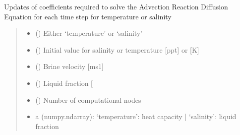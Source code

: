 \documentclass[a4paper,11pt,english,openany]{sphinxmanual}
\begin{document}
\begin{fulllineitems}
\label{\detokenize{api/spyice.coefficients:src.spyice.coefficients.update_coefficients}}
\pysigstartsignatures
\pysiglinewithargsret
{}
{\sphinxparamcomma {}\sphinxparamcomma {}\sphinxparamcomma {}\sphinxparamcomma {}\sphinxparamcomma {}}
{}
\pysigstopsignatures
\sphinxAtStartPar
Updates of coefficients required to solve the Advection Reaction Diffusion Equation for each time step for temperature or salinity
\begin{quote}\begin{description}
\begin{itemize}
\item {} 
\sphinxAtStartPar
{} () \textendash{} Either ‘temperature’ or ‘salinity’

\item {} 
\sphinxAtStartPar
{} () \textendash{} Initial value for salinity or temperature {[}ppt{]} or {[}K{]}

\item {} 
\sphinxAtStartPar
{} () \textendash{} Brine velocity {[}ms\sphinxhyphen{}1{]}

\item {} 
\sphinxAtStartPar
{} () \textendash{} Liquid fraction {[}\sphinxhyphen{}{]}

\item {} 
\sphinxAtStartPar
{} () \textendash{} Number of computational nodes

\end{itemize}

\sphinxAtStartPar
\begin{description}
\begin{itemize}
\item {} 
\sphinxAtStartPar
a (numpy.ndarray): ‘temperature’: heat capacity | ‘salinity’: liquid fraction


\end{itemize}
\end{description}
\end{description}
\end{quote}
\end{fulllineitems}
\end{document}
